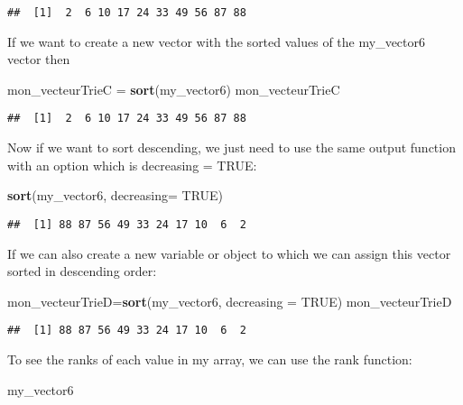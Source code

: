 \documentclass[
]{article}
\newenvironment{Shaded}{\begin{snugshade}}{\end{snugshade}}
\newcommand{\AttributeTok}[1]{\textcolor[rgb]{0.13,0.29,0.53}{#1}}
\newcommand{\ConstantTok}[1]{\textcolor[rgb]{0.56,0.35,0.01}{#1}}
\newcommand{\FunctionTok}[1]{\textcolor[rgb]{0.13,0.29,0.53}{\textbf{#1}}}
\newcommand{\NormalTok}[1]{#1}
\newcommand{\OtherTok}[1]{\textcolor[rgb]{0.56,0.35,0.01}{#1}}
\begin{document}
\begin{verbatim}
##  [1]  2  6 10 17 24 33 49 56 87 88
\end{verbatim}

If we want to create a new vector with the sorted values of the
my\_vector6 vector then

\begin{Shaded}
\begin{Highlighting}[]
\NormalTok{mon\_vecteurTrieC }\OtherTok{=} \FunctionTok{sort}\NormalTok{(my\_vector6)}
\NormalTok{mon\_vecteurTrieC}
\end{Highlighting}
\end{Shaded}

\begin{verbatim}
##  [1]  2  6 10 17 24 33 49 56 87 88
\end{verbatim}

Now if we want to sort descending, we just need to use the same output
function with an option which is decreasing = TRUE:

\begin{Shaded}
\begin{Highlighting}[]
\FunctionTok{sort}\NormalTok{(my\_vector6, }\AttributeTok{decreasing=} \ConstantTok{TRUE}\NormalTok{)}
\end{Highlighting}
\end{Shaded}

\begin{verbatim}
##  [1] 88 87 56 49 33 24 17 10  6  2
\end{verbatim}

If we can also create a new variable or object to which we can assign
this vector sorted in descending order:

\begin{Shaded}
\begin{Highlighting}[]
\NormalTok{mon\_vecteurTrieD}\OtherTok{=}\FunctionTok{sort}\NormalTok{(my\_vector6, }\AttributeTok{decreasing =} \ConstantTok{TRUE}\NormalTok{)}
\NormalTok{mon\_vecteurTrieD}
\end{Highlighting}
\end{Shaded}

\begin{verbatim}
##  [1] 88 87 56 49 33 24 17 10  6  2
\end{verbatim}

To see the ranks of each value in my array, we can use the rank
function:

\begin{Shaded}
\begin{Highlighting}[]
\NormalTok{my\_vector6}
\end{Highlighting}
\end{Shaded}
\end{document}
